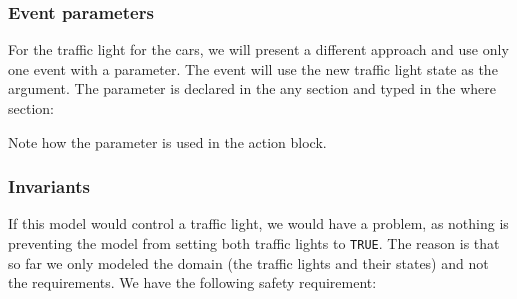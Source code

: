 
\subsubsection{Event parameters}

For the traffic light for the cars, we will present a different approach and use only one event with a parameter.  The event will use the new traffic light state as the argument.  The parameter is declared in the \textsf{any} section and typed in the \textsf{where} section:


Note how the parameter is used in the action block.

\subsubsection{Invariants}
\label{tutorial:invariants}

If this model would control a traffic light, we would have a problem, as nothing is preventing the model from setting both traffic lights to \texttt{TRUE}.  The reason is that so far we only modeled the domain (the traffic lights and their states) and not the requirements.  We have the following safety requirement:

